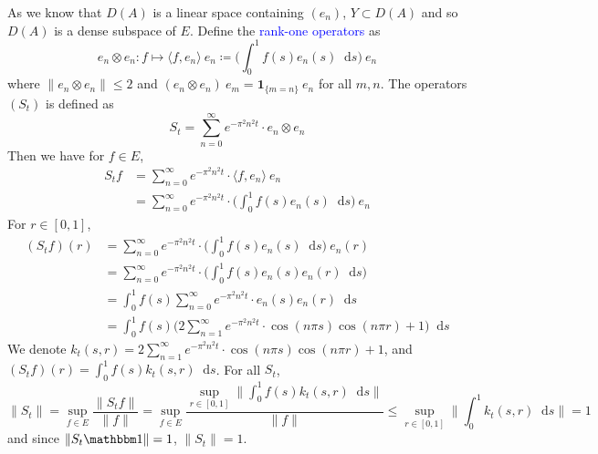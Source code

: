 \documentclass[12pt, reqno]{amsart}
\renewcommand{\leq}{\leqslant}
\newcommand{\1}{\mathbbm 1}
\newcommand*\diff{\mathop{}\!\mathrm{d}}
\theoremstyle{plain}
\theoremstyle{definition}
\newcommand{\navy}[1]{\textcolor{blue}{#1}}
\begin{document}
As we know that $D(A)$ is a linear space containing $(e_n)$, $Y\subset D(A)$ and so $D(A)$ is a dense subspace of $E.$ Define the \navy{rank-one operators} as
\begin{equation*}
e_n\otimes e_n\colon f\mapsto \big \langle f,e_n \big \rangle\ e_n\coloneq \Big (\int_{0}^{1}f(s)e_n(s)\diff s\Big)\ e_n
\end{equation*}
where $\|e_n\otimes e_n\| \leq 2$ and  $(e_n\otimes e_n)\ e_m=\mathbf{1}_{\{m=n\}}\ e_n$ for all $m,n$. The operators $(S_t)$ is defined as 
\begin{equation}\label{eq:diff-semi}
	S_t=\sum_{n=0}^{\infty} e^{-\pi^2n^2 t} \cdot e_n\otimes e_n
\end{equation}
Then we have for $f\in E$,
\begin{align*}
	S_tf&=\sum_{n=0}^{\infty} e^{-\pi^2n^2 t} \cdot \langle f,e_n \big \rangle\ e_n\\
	       &=\sum_{n=0}^{\infty} e^{-\pi^2n^2 t} \cdot \Big (\int_{0}^{1}f(s)e_n(s)\diff s\Big)\ e_n
\end{align*}
For $r\in [0,1]$, 
\begin{align*}
	(S_tf)(r)&=\sum_{n=0}^{\infty} e^{-\pi^2n^2 t} \cdot \Big (\int_{0}^{1}f(s)e_n(s)\diff s\Big)\ e_n(r)\\
	               &=\sum_{n=0}^{\infty} e^{-\pi^2n^2 t} \cdot \Big (\int_{0}^{1}f(s)e_n(s)e_n(r)\diff s\Big)\ \\
	               &=\int_{0}^{1}f(s)\sum_{n=0}^{\infty} e^{-\pi^2n^2 t} \cdot e_n(s)e_n(r)\diff s \\
	               &=\int_{0}^{1}f(s)\Big(2\sum_{n=1}^{\infty} e^{-\pi^2n^2 t} \cdot \cos(n\pi s)\cos(n\pi r)+1\Big)\diff s 	               
\end{align*}
We denote $k_t(s,r)=2\sum_{n=1}^{\infty} e^{-\pi^2n^2 t} \cdot \cos(n\pi s)\cos(n\pi r)+1$, and $(S_tf)(r)=\int_{0}^{1}f(s) k_t(s,r)\diff s $. For all $S_t$,
\begin{equation*}
	\|S_t\|=\sup_{f\in E}\frac{\|S_t f\|}{\|f\|}=\sup_{f\in E}\frac{\sup_{r\in [0,1]}\|\int_{0}^{1}f(s) k_t(s,r)\diff s \|}{\|f\|}\leq \sup_{r\in [0,1]}\|\int_{0}^{1}k_t(s,r)\diff s \|=1
\end{equation*}
and since $\|S_t\1\|=1$, $\|S_t\|=1.$
\end{document}
